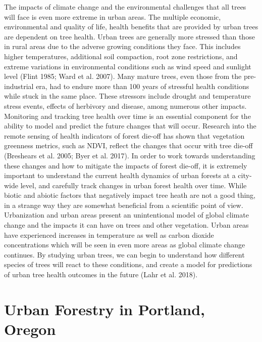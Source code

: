 \documentclass[12pt,twoside]{reedthesis}
\begin{document}
The impacts of climate change and the environmental challenges that all
trees will face is even more extreme in urban areas. The multiple
economic, environmental and quality of life, health benefits that are
provided by urban trees are dependent on tree health. Urban trees are
generally more stressed than those in rural areas due to the adverse
growing conditions they face. This includes higher temperatures,
additional soil compaction, root zone restrictions, and extreme
variations in environmental conditions such as wind speed and sunlight
level (Flint 1985; Ward et al. 2007). Many mature trees, even those from the
pre-industrial era, had to endure more than 100 years of stressful
health conditions while stuck in the same place. These stressors include
drought and temperature stress events, effects of herbivory and disease,
among numerous other impacts. Monitoring and tracking tree health over
time is an essential component for the ability to model and predict the
future changes that will occur. Research into the remote sensing of
health indicators of forest die-off has shown that vegetation greenness
metrics, such as NDVI, reflect the changes that occur with tree die-off
(Breshears et al. 2005; Byer et al. 2017). In order to work towards understanding
these changes and how to mitigate the impacts of forest die-off, it is
extremely important to understand the current health dynamics of urban
forests at a city-wide level, and carefully track changes in urban
forest health over time. While biotic and abiotic factors that
negatively impact tree heath are not a good thing, in a strange way they
are somewhat beneficial from a scientific point of view. Urbanization
and urban areas present an unintentional model of global climate change
and the impacts it can have on trees and other vegetation. Urban areas
have experienced increases in temperature as well as carbon dioxide
concentrations which will be seen in even more areas as global climate
change continues. By studying urban trees, we can begin to understand
how different species of trees will react to these conditions, and
create a model for predictions of urban tree health outcomes in the
future (Lahr et al. 2018).

\hypertarget{urban-forestry-in-portland-oregon}{%
\section{Urban Forestry in Portland, Oregon}\label{urban-forestry-in-portland-oregon}}
\end{document}
